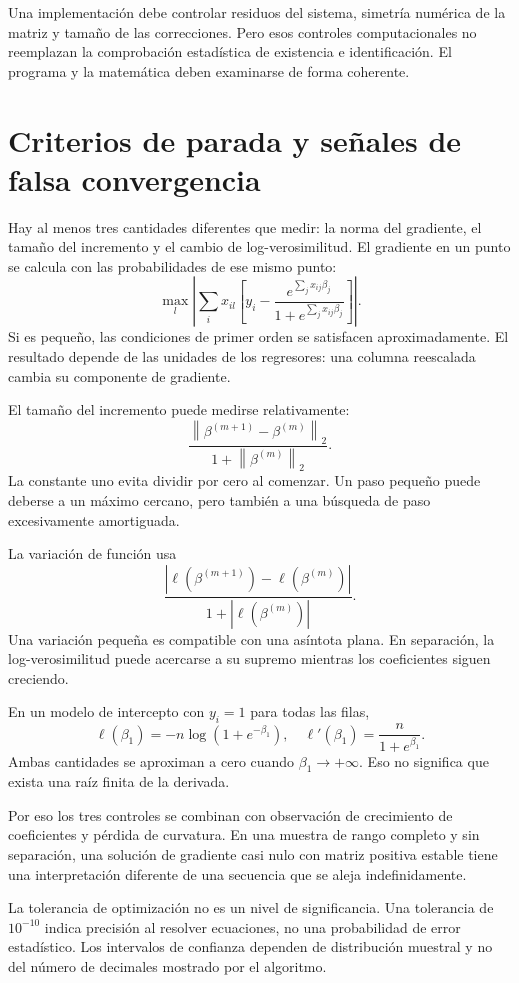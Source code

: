 \documentclass[11pt,a4paper]{article}
\newcommand{\norm}[1]{\left\lVert #1\right\rVert}
\begin{document}
Una implementación debe controlar residuos del sistema,
simetría numérica de la matriz y tamaño de las correcciones.
Pero esos controles computacionales no reemplazan la
comprobación estadística de existencia e identificación.
El programa y la matemática deben examinarse de forma coherente.

\clearpage
\section{Criterios de parada y señales de falsa convergencia}\label{logit50}
Hay al menos tres cantidades diferentes que medir:
la norma del gradiente, el tamaño del incremento y el cambio
de log-verosimilitud.
El gradiente en un punto se calcula con las probabilidades
de ese mismo punto:
\[
\max_l\left|
\sum_i x_{il}\left[
y_i-\frac{e^{\sum_jx_{ij}\beta_j}}{1+e^{\sum_jx_{ij}\beta_j}}
\right]\right|.
\]
Si es pequeño, las condiciones de primer orden se satisfacen
aproximadamente. El resultado depende de las unidades de los
regresores: una columna reescalada cambia su componente de gradiente.

El tamaño del incremento puede medirse relativamente:
\[
\frac{\norm{\beta^{(m+1)}-\beta^{(m)}}_2}
{1+\norm{\beta^{(m)}}_2}.
\]
La constante uno evita dividir por cero al comenzar.
Un paso pequeño puede deberse a un máximo cercano, pero también
a una búsqueda de paso excesivamente amortiguada.

La variación de función usa
\[
\frac{|\ell(\beta^{(m+1)})-\ell(\beta^{(m)})|}
{1+|\ell(\beta^{(m)})|}.
\]
Una variación pequeña es compatible con una asíntota plana.
En separación, la log-verosimilitud puede acercarse a su supremo
mientras los coeficientes siguen creciendo.

\begin{ejemplo}
En un modelo de intercepto con $y_i=1$ para todas las filas,
\[
\ell(\beta_1)=-n\log(1+e^{-\beta_1}),\quad
\ell'(\beta_1)=\frac n{1+e^{\beta_1}}.
\]
Ambas cantidades se aproximan a cero cuando $\beta_1\to+\infty$.
Eso no significa que exista una raíz finita de la derivada.
\end{ejemplo}
Por eso los tres controles se combinan con observación de
crecimiento de coeficientes y pérdida de curvatura.
En una muestra de rango completo y sin separación, una
solución de gradiente casi nulo con matriz positiva estable
tiene una interpretación diferente de una secuencia que se
aleja indefinidamente.

La tolerancia de optimización no es un nivel de significancia.
Una tolerancia de $10^{-10}$ indica precisión al resolver
ecuaciones, no una probabilidad de error estadístico.
Los intervalos de confianza dependen de distribución muestral
y no del número de decimales mostrado por el algoritmo.
\end{document}
